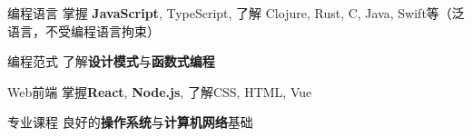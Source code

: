 

\begin{cvskills}

    \cvskill
    {编程语言} %
    {掌握 \textbf{JavaScript}, TypeScript, 了解 Clojure, Rust, C, Java, Swift等（泛语言，不受编程语言拘束）} %

    \cvskill
    {编程范式} %
    {了解\textbf{设计模式}与\textbf{函数式编程}} %

    \cvskill
    {Web前端} %
    {掌握\textbf{React}, \textbf{Node.js}, 了解CSS, HTML, Vue} %

    \cvskill
    {专业课程} %
    {良好的\textbf{操作系统}与\textbf{计算机网络}基础} %

\end{cvskills}
